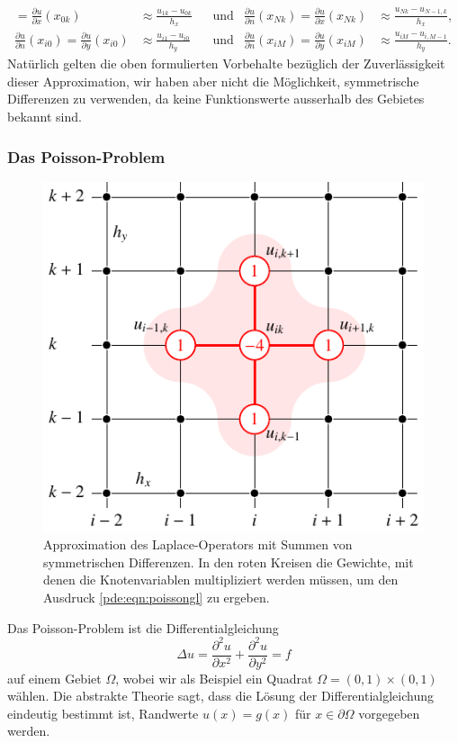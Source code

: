 \begin{beispiel}
\begin{align*}
=
\frac{\partial u}{\partial x}(x_{0k})
&\approx
\frac{u_{1k}-u_{0k}}{h_x}
&&\text{und}&
\frac{\partial u}{\partial n}(x_{Nk})
=
\frac{\partial u}{\partial x}(x_{Nk})
&\approx
\frac{u_{Nk}-u_{N-1,k}}{h_x},
\\
\frac{\partial u}{\partial n}(x_{i0})
=
\frac{\partial u}{\partial y}(x_{i0})
&\approx
\frac{u_{i1}-u_{i0}}{h_y}
&&\text{und}&
\frac{\partial u}{\partial n}(x_{iM})
=
\frac{\partial u}{\partial y}(x_{iM})
&\approx
\frac{u_{iM}-u_{i,M-1}}{h_y}.
\end{align*}
Natürlich gelten die oben formulierten Vorbehalte bezüglich der
Zuverlässigkeit dieser Approximation, wir haben aber nicht die Möglichkeit,
symmetrische Differenzen zu verwenden, da keine Funktionswerte ausserhalb
des Gebietes bekannt sind.
\end{beispiel}


\subsubsection{Das Poisson-Problem}
\begin{figure}
\centering
\includegraphics{chapters/70-pde/images/laplace.pdf}
\caption{Approximation des Laplace-Operators mit Summen von symmetrischen
Differenzen.
In den roten Kreisen die Gewichte, mit denen die Knotenvariablen 
multipliziert werden müssen, um den Ausdruck
\eqref{pde:eqn:poissongl} zu ergeben.
\label{buch:pde:laplace}}
\end{figure}
Das Poisson-Problem ist die Differentialgleichung
\begin{equation}
\Delta u
=
\frac{\partial^2 u}{\partial x^2}
+
\frac{\partial^2 u}{\partial y^2}
=
f
\label{buch:pde:poissondgl}
\end{equation}
auf einem Gebiet $\Omega$, wobei wir als Beispiel ein Quadrat
$\Omega = (0,1) \times (0,1)$ wählen.
Die abstrakte Theorie sagt, dass die Lösung der Differentialgleichung
eindeutig bestimmt ist, Randwerte $u(x)=g(x)$ für $x\in\partial\Omega$
vorgegeben werden.

